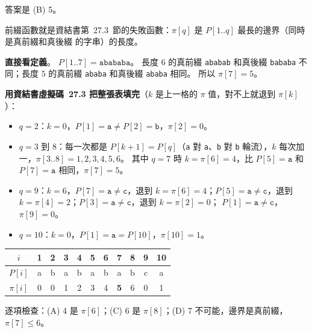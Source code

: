 \begin{pastsoln}
答案是 (B) 5。

前綴函數就是資結書第~27.3~節的失敗函數：$\pi[q]$ 是 $P[1..q]$ 最長的邊界（同時是真前綴和真後綴
的字串）的長度。

\textbf{直接看定義}。 $P[1..7] = \mathtt{abababa}$。 長度 $6$ 的真前綴 \texttt{ababab} 和真後綴
\texttt{bababa} 不同；長度 $5$ 的真前綴 \texttt{ababa} 和真後綴 \texttt{ababa} 相同。 所以
$\pi[7] = 5$。

\textbf{用資結書虛擬碼~27.3 把整張表填完}（$k$ 是上一格的 $\pi$ 值，對不上就退到 $\pi[k]$）：
\begin{itemize}
\item $q = 2$：$k = 0$，$P[1] = \mathtt{a} \ne P[2] = \mathtt{b}$，$\pi[2] = 0$。
\item $q = 3$ 到 $8$：每一次都是 $P[k + 1] = P[q]$（\texttt{a} 對 \texttt{a}、\texttt{b} 對 \texttt{b}
輪流），$k$ 每次加一，$\pi[3..8] = 1, 2, 3, 4, 5, 6$。 其中 $q = 7$ 時 $k = \pi[6] = 4$，比
$P[5] = \mathtt{a}$ 和 $P[7] = \mathtt{a}$ 相同，$\pi[7] = 5$。
\item $q = 9$：$k = 6$，$P[7] = \mathtt{a} \ne \mathtt{c}$，退到 $k = \pi[6] = 4$；$P[5] = \mathtt{a}
\ne \mathtt{c}$，退到 $k = \pi[4] = 2$；$P[3] = \mathtt{a} \ne \mathtt{c}$，退到 $k = \pi[2] = 0$；
$P[1] = \mathtt{a} \ne \mathtt{c}$，$\pi[9] = 0$。
\item $q = 10$：$k = 0$，$P[1] = \mathtt{a} = P[10]$，$\pi[10] = 1$。
\end{itemize}
\begin{center}
\begin{tabular}{c|cccccccccc}
$i$ & 1 & 2 & 3 & 4 & 5 & 6 & 7 & 8 & 9 & 10 \\ \hline
$P[i]$ & a & b & a & b & a & b & a & b & c & a \\
$\pi[i]$ & 0 & 0 & 1 & 2 & 3 & 4 & \textbf{5} & 6 & 0 & 1 \\
\end{tabular}
\end{center}

逐項檢查：(A) 4 是 $\pi[6]$；(C) 6 是 $\pi[8]$；(D) 7 不可能，邊界是真前綴，$\pi[7] \le 6$。
\end{pastsoln}
